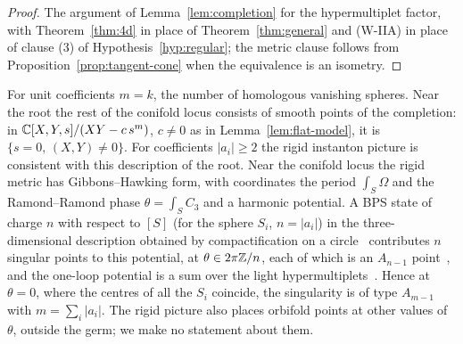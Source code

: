 \begin{proof}
The argument of Lemma~\ref{lem:completion} for the hypermultiplet factor, with
Theorem~\ref{thm:4d} in place of Theorem~\ref{thm:general} and (W-IIA) in place of clause (3) of
Hypothesis~\ref{hyp:regular}; the metric clause follows from Proposition~\ref{prop:tangent-cone} when the
equivalence is an isometry.
\end{proof}

For unit coefficients $m=k$, the number of homologous vanishing spheres. Near the root the rest of the
conifold locus consists of smooth points of the completion: in $\mathbb C[X,Y,s]/(XY-c\,s^m)$, $c\neq0$ as in Lemma~\ref{lem:flat-model}, it is
$\{s=0,\,(X,Y)\neq0\}$. For coefficients $|a_i|\geq2$ the rigid instanton picture is consistent with this description of the root.
Near the conifold locus the rigid metric has Gibbons--Hawking form, with coordinates the period $\int_S\Omega$
and the Ramond--Ramond phase $\theta=\int_SC_3$ and a harmonic potential. A BPS state of charge $n$ with
respect to $[S]$ (for the sphere $S_i$, $n=|a_i|$) in the three-dimensional description obtained by compactification on a
circle~\cite{SeibergShenker:1996} contributes $n$ singular points to this
potential, at $\theta\in2\pi\mathbb Z/n$, each of which is an $A_{n-1}$ point~\cite[Sect.~4.1]{Gaiotto:2008cd}, and
the one-loop potential is a sum over the light hypermultiplets~\cite{SeibergShenker:1996,Gaiotto:2008cd}.
Hence at $\theta=0$, where the centres of all the $S_i$ coincide, the singularity is of type $A_{m-1}$ with
$m=\sum_i|a_i|$. The rigid picture also places orbifold points
at other values of $\theta$, outside the germ; we make no statement about them.
